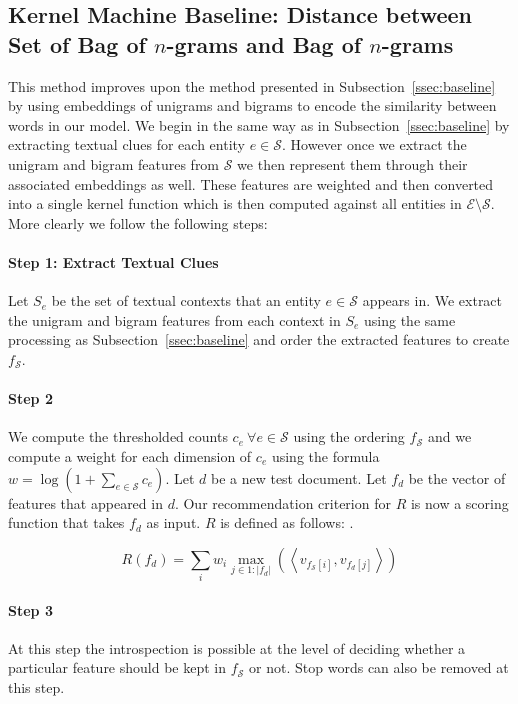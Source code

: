 \documentclass{article}
\newcommand{\ssecref}[1]{Subsection~\ref{#1}}
\newcommand{\ems}{$\mathcal{E} \setminus \mathcal{S}$}
\newcommand{\vip}[2]{\left\langle v_{#1}, v_{#2} \right\rangle}
\newcommand{\Todo}[1]{\todo[author=Pushpendre,size=\small,inline]{#1}}
\begin{document}
\subsection{Kernel Machine Baseline: Distance between Set of Bag of $n$-grams
  and Bag of $n$-grams}
\label{sec:kernel-machine}
This method improves upon the method presented in \ssecref{ssec:baseline}
by using embeddings of unigrams and bigrams to encode the similarity between
words in our model. We begin in the same way as in \ssecref{ssec:baseline}
by extracting textual clues for each entity $e \in \mathcal{S}$. However once
we extract the unigram and bigram features from $\mathcal{S}$ we then represent
them through their associated embeddings as well. These features are weighted
and then converted into a single kernel function which is then computed against
all entities in \ems. More clearly we follow the
following steps:
\paragraph{Step 1: Extract Textual Clues}
Let $S_e$ be the set of textual contexts that an entity $e \in \mathcal{S}$
appears in. We extract the unigram and bigram features from each context in
$S_e$ using the same processing as \ssecref{ssec:baseline} and order the
extracted features to create $f_{\mathcal{S}}$.
\paragraph{Step 2}
We compute the thresholded counts $c_e \ \forall e \in \mathcal{S}$ using the
ordering $f_{\mathcal{S}}$ and we
compute a weight for each dimension of $c_e$ using the formula
$w = \log \left(1 + {\sum_{e \in \mathcal{S}}c_e}\right)$.
Let $d$ be a new test document.
Let $f_d$ be the vector of features that appeared in $d$.
Our recommendation criterion for $R$ is now a scoring
function that takes $f_d$ as input.
$R$ is defined as follows:
\Todo{$R$ is mercer.}.

\begin{equation}
  \label{eq:baseline-wsim-rc}
  R(f_d) = \sum_i w_i \max_{j \in 1:|f_d|}(\vip{f_{\mathcal{S}}[i]}{f_d[j]})
\end{equation}

\paragraph{Step 3}
At this step the introspection is possible at the level of deciding whether a
particular feature should be kept in $f_{\mathcal{S}}$ or not. Stop words can
also be removed at this step.
\end{document}
